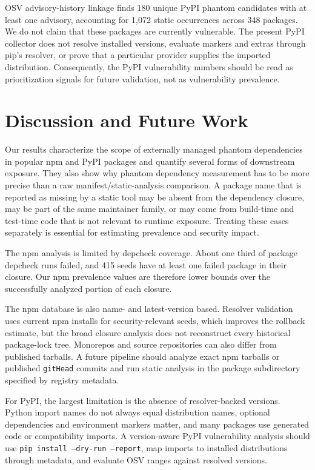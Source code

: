 \documentclass[letterpaper,twocolumn,10pt]{article}
\newcommand{\npm}{npm\xspace}
\newcommand{\pypi}{PyPI\xspace}
\begin{document}
OSV advisory-history linkage finds 180 unique \pypi phantom candidates with at
least one advisory, accounting for 1,072 static occurrences across 348 packages.
We do not claim that these packages are currently vulnerable.  The present
\pypi collector does not resolve installed versions, evaluate markers and
extras through pip's resolver, or prove that a particular provider supplies the
imported distribution.  Consequently, the \pypi vulnerability numbers should be
read as prioritization signals for future validation, not as vulnerability
prevalence.

\section{Discussion and Future Work}

Our results characterize the scope of externally managed phantom dependencies
in popular \npm and \pypi packages and quantify several forms of downstream
exposure.  They also show why phantom dependency measurement has to be more
precise than a raw manifest/static-analysis comparison.  A package name that is
reported as missing by a static tool may be absent from the dependency closure,
may be part of the same maintainer family, or may come from build-time and
test-time code that is not relevant to runtime exposure.  Treating these cases
separately is essential for estimating prevalence and security impact.

The \npm analysis is limited by depcheck coverage.  About one third of package
depcheck runs failed, and 415 seeds have at least one failed package in their
closure.  Our \npm prevalence values are therefore lower bounds over the
successfully analyzed portion of each closure.

The \npm database is also name- and latest-version based.  Resolver validation
uses current \npm installs for security-relevant seeds, which improves the
rollback estimate, but the broad closure analysis does not reconstruct every
historical package-lock tree.  Monorepos and source repositories can also differ
from published tarballs.  A future pipeline should analyze exact npm tarballs or
published \texttt{gitHead} commits and run static analysis in the package
subdirectory specified by registry metadata.

For \pypi, the largest limitation is the absence of resolver-backed versions.
Python import names do not always equal distribution names, optional
dependencies and environment markers matter, and many packages use generated
code or compatibility imports.  A version-aware \pypi vulnerability analysis
should use \texttt{pip install --dry-run --report}, map imports to installed
distributions through metadata, and evaluate OSV ranges against resolved
versions.
\end{document}
